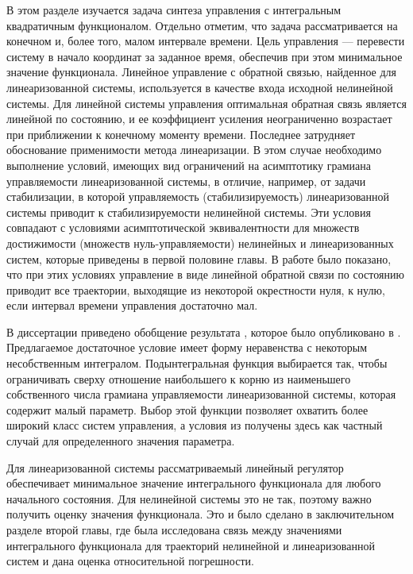 \documentclass[../main.tex]{subfiles}
\begin{document}
В этом разделе изучается задача синтеза управления с интегральным квадратичным функционалом. 
Отдельно отметим, что задача рассматривается на конечном и, более того, малом интервале времени. 
Цель управления --- перевести систему в начало координат за заданное время, обеспечив при этом минимальное значение функционала. 
Линейное управление с обратной связью, найденное для линеаризованной системы, используется в качестве входа исходной нелинейной системы. 
Для линейной системы управления оптимальная обратная связь является линейной по состоянию, и ее коэффициент усиления неограниченно возрастает при приближении к конечному моменту времени. 
Последнее затрудняет обоснование применимости метода линеаризации. 
В этом случае необходимо выполнение условий, имеющих вид ограничений на асимптотику грамиана управляемости линеаризованной системы, в отличие, например, от задачи стабилизации, в которой управляемость (стабилизируемость) линеаризованной системы приводит к стабилизируемости нелинейной системы. 
Эти условия совпадают с условиями асимптотической эквивалентности для множеств достижимости (множеств нуль-управляемости) нелинейных и линеаризованных систем, которые приведены в первой половине главы. 
В работе \cite{GusevOsipov} было показано, что при этих условиях управление в виде линейной обратной связи по состоянию приводит все траектории, выходящие из некоторой окрестности нуля, к нулю, если интервал времени управления достаточно мал. 

В диссертации приведено обобщение результата \cite{GusevOsipov}, которое было опубликовано в \cite{GusevOsipovMotor}. 
Предлагаемое достаточное условие имеет форму неравенства с некоторым несобственным интегралом.
Подынтегральная функция выбирается так, чтобы ограничивать сверху отношение наибольшего к корню из наименьшего собственного числа грамиана управляемости линеаризованной системы, которая содержит малый параметр. 
Выбор этой функции позволяет охватить более широкий класс систем управления, а условия из \cite{GusevOsipov} получены здесь как частный случай для определенного значения параметра.

Для линеаризованной системы рассматриваемый линейный регулятор обеспечивает минимальное значение интегрального функционала для любого начального состояния. 
Для нелинейной системы это не так, поэтому важно получить оценку значения функционала. 
Это и было сделано в заключительном разделе второй главы, где была исследована связь между значениями интегрального функционала для траекторий нелинейной и линеаризованной систем и дана оценка относительной погрешности. 
\end{document}
